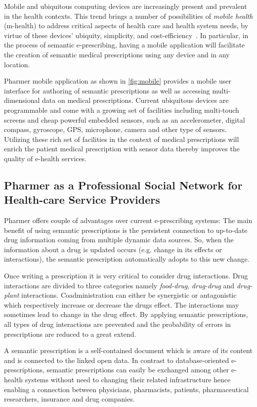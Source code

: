 \documentclass[journal]{IEEEtran}
\begin{document}
Mobile and ubiquitous computing devices are increasingly present and prevalent in the health contexts.
This trend brings a number of possibilities of \emph{mobile health} (m-health) to address critical aspects of health care and health system needs, by virtue of these devices’ ubiquity, simplicity, and cost-efficiency~\cite{mHealth}.
In particular, in the process of semantic e-prescribing, having a mobile application will facilitate the creation of semantic medical prescriptions using any device and in any location.

Pharmer mobile application as shown in \autoref{fig:mobile} provides a mobile user interface for authoring of semantic prescriptions as well as accessing multi-dimensional data on medical prescriptions.
Current ubiquitous devices are programmable and come with a growing set of facilities including multi-touch screens and cheap powerful embedded sensors, such as an accelerometer, digital compass, gyroscope, GPS, microphone, camera and other type of sensors.
Utilizing these rich set of facilities in the context of medical prescriptions will enrich the patient medical prescription with sensor data thereby improves the quality of e-health services.

\subsection{Pharmer as a Professional Social Network for Health-care Service Providers}
\label{sec:Pharmernet}
Pharmer offers couple of advantages over current e-prescribing systems:
The main benefit of using semantic prescriptions is the persistent connection to up-to-date drug information coming from multiple dynamic data sources.
So, when the information about a drug is updated occurs (e.g. change in its effects or interactions), the semantic prescription automatically adopts to this new change.

Once writing a prescription it is very critical to consider drug interactions.
Drug interactions are divided to three categories namely \emph{food-drug}, \emph{drug-drug} and \emph{drug-plant} interactions.
Coadministration can either be synergistic or antagonistic which respectively increase or decrease the drugs effect.
The interactions may sometimes lead to change in the drug effect.
By applying semantic prescriptions, all types of drug interactions are prevented and the probability of errors in prescriptions are reduced to a great extend.

A semantic prescription is a self-contained document which is aware of its content and is connected to the linked open data.
In contrast to database-oriented e-prescriptions, semantic prescriptions can easily be exchanged among other e-health systems without need to changing their related infrastructure hence enabling a connection between physicians, pharmacists, patients, pharmaceutical researchers, insurance and drug companies.
\end{document}
